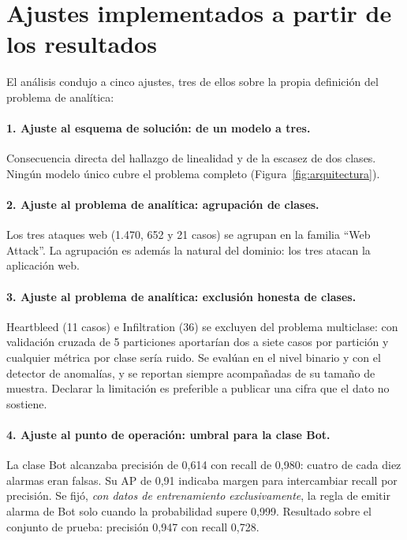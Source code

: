 \documentclass[11pt,a4paper]{article}
\begin{document}
\section{Ajustes implementados a partir de los resultados}
\label{sec:ajustes}

El análisis condujo a cinco ajustes, tres de ellos sobre la propia definición
del problema de analítica:

\paragraph{1. Ajuste al esquema de solución: de un modelo a tres.}
Consecuencia directa del hallazgo de linealidad y de la escasez de dos
clases. Ningún modelo único cubre el problema completo
(Figura~\ref{fig:arquitectura}).

\paragraph{2. Ajuste al problema de analítica: agrupación de clases.}
Los tres ataques web (1.470, 652 y 21 casos) se agrupan en la familia
``Web Attack''. La agrupación es además la natural del dominio: los tres
atacan la aplicación web.

\paragraph{3. Ajuste al problema de analítica: exclusión honesta de clases.}
Heartbleed (11 casos) e Infiltration (36) se excluyen del problema
multiclase: con validación cruzada de 5 particiones aportarían dos a siete
casos por partición y cualquier métrica por clase sería ruido. Se evalúan en
el nivel binario y con el detector de anomalías, y se reportan siempre
acompañadas de su tamaño de muestra. Declarar la limitación es preferible a
publicar una cifra que el dato no sostiene.

\paragraph{4. Ajuste al punto de operación: umbral para la clase Bot.}
La clase Bot alcanzaba precisión de 0,614 con recall de 0,980: cuatro de cada
diez alarmas eran falsas. Su AP de 0,91 indicaba margen para intercambiar
recall por precisión. Se fijó, \emph{con datos de entrenamiento
exclusivamente}, la regla de emitir alarma de Bot solo cuando la probabilidad
supere 0,999. Resultado sobre el conjunto de prueba: precisión 0,947 con
recall 0,728.
\end{document}
